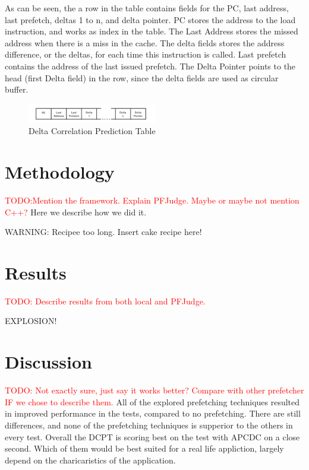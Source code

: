 \documentclass[a4paper]{IEEEtran}
\newcommand\TODO[1]{\textcolor{red}{TODO:#1}}
\newcommand\todo[1]{\TODO{#1}}
\begin{document}
As can be seen, the a row in the table contains fields for the PC, last address, last prefetch, deltas 1 to n, and delta pointer.
PC stores the address to the load instruction, and works as index in the table.
The Last Address stores the missed address when there is a miss in the cache.
The delta fields stores the address difference, or the deltas, for each time this instruction is called.
Last prefetch contains the address of the last issued prefetch.
The Delta Pointer points to the head (first Delta field) in the row, since the delta fields are used as circular buffer.

\begin{figure}[h!]
  \centering
      \includegraphics[width=0.5\textwidth]{Figures/DCTable}
  \caption{Delta Correlation Prediction Table}
  \label{fig:DCTable}
\end{figure}

\section{Methodology}

\todo{Mention the framework. Explain PFJudge. Maybe or maybe not mention C++?}
Here we describe how we did it.

WARNING: Recipee too long. Insert cake recipe here!

\section{Results}

\todo{ Describe results from both local and PFJudge.}



EXPLOSION!

\section{Discussion}

\todo{ Not exactly sure, just say it works better? Compare with other prefetcher IF we chose to describe them. }
All of the explored prefetching techniques resulted in improved performance in the tests, compared to no prefetching.
There are still differences, and none of the prefetching techniques is supperior to the others in every test.
Overall the DCPT is scoring best on the test with APCDC on a close second.
Which of them would be best suited for a real life appliction, largely depend on the charicaristics of the application.
\end{document}
